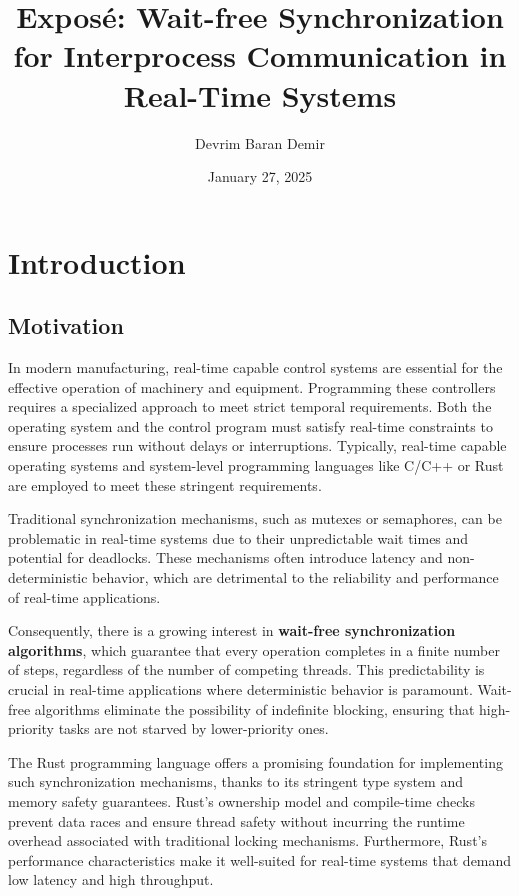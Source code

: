 \documentclass[ a4paper,
                toc=bibliography
              ]{scrartcl}
\author{Devrim Baran Demir}
\title{Exposé: Wait-free Synchronization for Interprocess Communication in Real-Time Systems}
\date{January 27, 2025}
\begin{document}
\maketitle

\section{Introduction}
\subsection{Motivation}

In modern manufacturing, real-time capable control systems are essential for the effective operation of machinery and equipment. Programming these controllers requires a specialized approach to meet strict temporal requirements. Both the operating system and the control program must satisfy real-time constraints to ensure processes run without delays or interruptions. Typically, real-time capable operating systems and system-level programming languages like C/C++ or Rust are employed to meet these stringent requirements.

Traditional synchronization mechanisms, such as mutexes or semaphores, can be problematic in real-time systems due to their unpredictable wait times and potential for deadlocks. These mechanisms often introduce latency and non-deterministic behavior, which are detrimental to the reliability and performance of real-time applications. \cite{herlihy1991wait, herlihy2012art, brandenburg2019multiprocessorrealtimelockingprotocols, kode2024analysisSynchronization}

Consequently, there is a growing interest in \textbf{wait-free synchronization algorithms}, which guarantee that every operation completes in a finite number of steps, regardless of the number of competing threads. This predictability is crucial in real-time applications where deterministic behavior is paramount. Wait-free algorithms eliminate the possibility of indefinite blocking, ensuring that high-priority tasks are not starved by lower-priority ones. \cite{kogan2012methodology, herlihy1991wait}

The Rust programming language offers a promising foundation for implementing such synchronization mechanisms, thanks to its stringent type system and memory safety guarantees. Rust's ownership model and compile-time checks prevent data races and ensure thread safety without incurring the runtime overhead associated with traditional locking mechanisms. Furthermore, Rust's performance characteristics make it well-suited for real-time systems that demand low latency and high throughput. \cite{xu2023rust,sharma2024rustembeddedsystemscurrent} 
\end{document}
